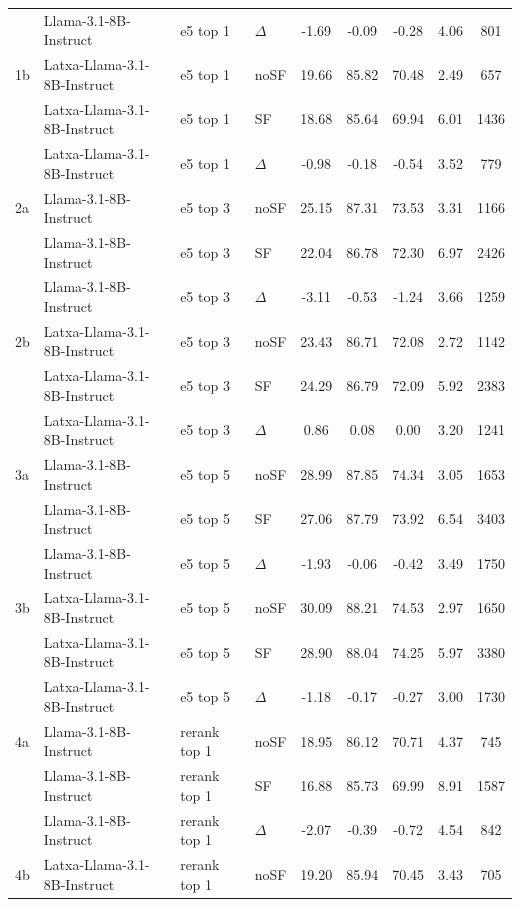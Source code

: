 \begin{scriptsize}
\begin{longtable}{l l l l c c c c c}
 & Llama-3.1-8B-Instruct & e5 top 1 & $\Delta$ & -1.69 & -0.09 & -0.28 & 4.06 & 801 \\
1b & Latxa-Llama-3.1-8B-Instruct & e5 top 1 & noSF & 19.66 & 85.82 & 70.48 & 2.49 & 657 \\
 & Latxa-Llama-3.1-8B-Instruct & e5 top 1 & SF & 18.68 & 85.64 & 69.94 & 6.01 & 1436 \\
 & Latxa-Llama-3.1-8B-Instruct & e5 top 1 & $\Delta$ & -0.98 & -0.18 & -0.54 & 3.52 & 779 \\
\dmidrule
2a & Llama-3.1-8B-Instruct & e5 top 3 & noSF & 25.15 & 87.31 & 73.53 & 3.31 & 1166 \\
 & Llama-3.1-8B-Instruct & e5 top 3 & SF & 22.04 & 86.78 & 72.30 & 6.97 & 2426 \\
 & Llama-3.1-8B-Instruct & e5 top 3 & $\Delta$ & -3.11 & -0.53 & -1.24 & 3.66 & 1259 \\
2b & Latxa-Llama-3.1-8B-Instruct & e5 top 3 & noSF & 23.43 & 86.71 & 72.08 & 2.72 & 1142 \\
 & Latxa-Llama-3.1-8B-Instruct & e5 top 3 & SF & 24.29 & 86.79 & 72.09 & 5.92 & 2383 \\
 & Latxa-Llama-3.1-8B-Instruct & e5 top 3 & $\Delta$ & 0.86 & 0.08 & 0.00 & 3.20 & 1241 \\
\dmidrule
3a & Llama-3.1-8B-Instruct & e5 top 5 & noSF & 28.99 & 87.85 & 74.34 & 3.05 & 1653 \\
 & Llama-3.1-8B-Instruct & e5 top 5 & SF & 27.06 & 87.79 & 73.92 & 6.54 & 3403 \\
 & Llama-3.1-8B-Instruct & e5 top 5 & $\Delta$ & -1.93 & -0.06 & -0.42 & 3.49 & 1750 \\
3b & Latxa-Llama-3.1-8B-Instruct & e5 top 5 & noSF & 30.09 & 88.21 & 74.53 & 2.97 & 1650 \\
 & Latxa-Llama-3.1-8B-Instruct & e5 top 5 & SF & 28.90 & 88.04 & 74.25 & 5.97 & 3380 \\
 & Latxa-Llama-3.1-8B-Instruct & e5 top 5 & $\Delta$ & -1.18 & -0.17 & -0.27 & 3.00 & 1730 \\
\dmidrule
4a & Llama-3.1-8B-Instruct & rerank top 1 & noSF & 18.95 & 86.12 & 70.71 & 4.37 & 745 \\
 & Llama-3.1-8B-Instruct & rerank top 1 & SF & 16.88 & 85.73 & 69.99 & 8.91 & 1587 \\
 & Llama-3.1-8B-Instruct & rerank top 1 & $\Delta$ & -2.07 & -0.39 & -0.72 & 4.54 & 842 \\
4b & Latxa-Llama-3.1-8B-Instruct & rerank top 1 & noSF & 19.20 & 85.94 & 70.45 & 3.43 & 705 \\

\end{longtable}
\end{scriptsize}
